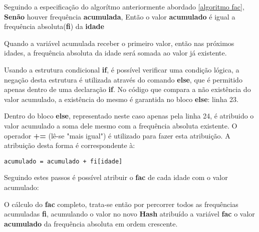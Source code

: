\documentclass[12pt]{article}
\newcommand{\code}[1] {\textbf{#1}}
\begin{document}
 

Seguindo a especificação do algorítmo anteriormente abordado \ref{algoritmo fac}, \code{Senão} houver frequência \code{acumulada}, Então o valor \code{acumulado} é igual a frequência absoluta(\code{fi}) da \code{idade} 

 

Quando a variável acumulada receber o primeiro valor, então nas próximos idades, a frequência absoluta da idade será somada ao valor já existente.

Usando a estrutura condicional \code{if}, é possível verificar uma condição lógica, a negação desta estrutura é utilizada através do comando \code{else}, que é permitido apenas dentro de uma declaração \code{if}. No código que compara a não existência do valor acumulado, a existência do mesmo é garantida no bloco \code{else}: linha 23.

 

Dentro do bloco \code{else}, representado neste caso apenas pela linha 24, é atribuido o valor acumulado a soma dele mesmo com a frequência absoluta existente. O operador \code{+=} (lê-se "mais igual") é utilizado para fazer esta atribuição. A atribuição desta forma é correspondente à:

\begin{lstlisting}[caption=Operador \code{+=} escrito de outra maneira ]
  acumulado = acumulado + fi[idade]
\end{lstlisting}

Seguindo estes passos é possível atribuir o \code{fac} de cada idade com o valor acumulado:

 

O cálculo do \code{fac} completo, trata-se então por percorrer todos as frequências acumuladas \code{fi}, acumulando o valor no novo \code{Hash} atribuído a variável \code{fac} o valor \code{acumulado} da frequência absoluta em ordem crescente.

 
\end{document}
